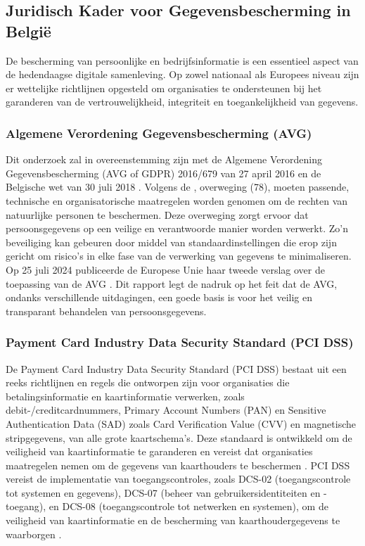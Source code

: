 \subsection{Juridisch Kader voor Gegevensbescherming in België}%

De bescherming van persoonlijke en bedrijfsinformatie is een essentieel aspect van de hedendaagse digitale samenleving. 
Op zowel nationaal als Europees niveau zijn er wettelijke richtlijnen opgesteld om organisaties te ondersteunen bij het garanderen van de vertrouwelijkheid, 
integriteit en toegankelijkheid van gegevens.

\subsubsection{Algemene Verordening Gegevensbescherming (AVG)}%

Dit onderzoek zal in overeenstemming zijn met de Algemene Verordening Gegevensbescherming (AVG of GDPR) 2016/679 van 27 april 2016 \autocite{eu_avg2016} en de Belgische wet van 30 juli 2018 \autocite{wet_bescherming_2018}.
Volgens de \textcite{eu_avg2016}, overweging (78), moeten passende, technische en organisatorische maatregelen worden genomen om de rechten van natuurlijke personen te beschermen. 
Deze overweging zorgt ervoor dat persoonsgegevens op een veilige en verantwoorde manier worden verwerkt. 
Zo'n beveiliging kan gebeuren door middel van standaardinstellingen die erop zijn gericht om risico's in elke fase van de verwerking van gegevens te minimaliseren.
Op 25 juli 2024 publiceerde de Europese Unie haar tweede verslag over de toepassing van de AVG \autocite{eu_avg2024}. 
Dit rapport legt de nadruk op het feit dat de AVG, ondanks verschillende uitdagingen, een goede basis is voor het veilig en transparant behandelen van persoonsgegevens. 


\subsubsection{Payment Card Industry Data Security Standard (PCI DSS)}%

De Payment Card Industry Data Security Standard (PCI DSS) bestaat uit een reeks richtlijnen en regels die ontworpen zijn voor organisaties die betalingsinformatie en kaartinformatie verwerken, 
zoals debit-/creditcardnummers, Primary Account Numbers (PAN) en Sensitive Authentication Data (SAD) zoals Card Verification Value (CVV) en magnetische stripgegevens, van alle grote kaartschema's. 
Deze standaard is ontwikkeld om de veiligheid van kaartinformatie te garanderen en vereist dat organisaties maatregelen nemen om de gegevens van kaarthouders te beschermen \autocite{Elluri2018}. 
PCI DSS vereist de implementatie van toegangscontroles, zoals DCS-02 (toegangscontrole tot systemen en gegevens), DCS-07 (beheer van gebruikersidentiteiten en -toegang), 
en DCS-08 (toegangscontrole tot netwerken en systemen), om de veiligheid van kaartinformatie en de bescherming van kaarthoudergegevens te waarborgen \autocite{Elluri2018}.

